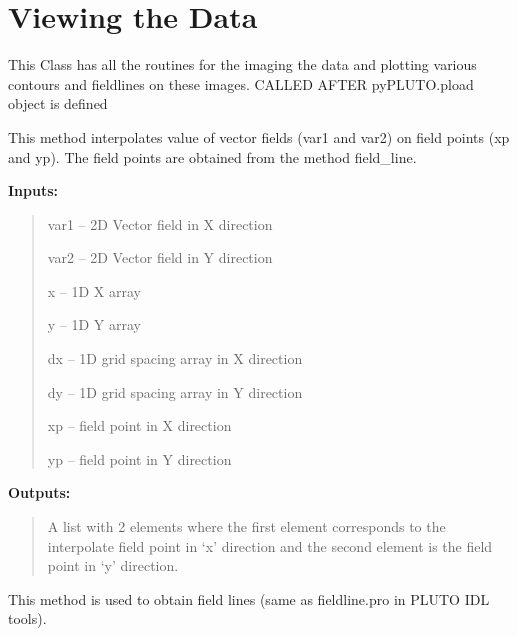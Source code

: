 \documentclass[letterpaper,10pt,english]{sphinxmanual}
\begin{document}
\section{Viewing the Data}
\label{image:viewing-the-data}\label{image::doc}

\begin{fulllineitems}
\label{image:pyPLUTO.Image}
This Class has all the routines for the imaging the data
and plotting various contours and fieldlines on these images.
CALLED AFTER pyPLUTO.pload object is defined

\begin{fulllineitems}
\label{image:pyPLUTO.Image.field_interp}
This method interpolates value of vector fields (var1 and var2) on field points (xp and yp).
The field points are obtained from the method field\_line.

\textbf{Inputs:}
\begin{quote}

var1 -- 2D Vector field in X direction

var2 -- 2D Vector field in Y direction

x -- 1D X array

y -- 1D Y array

dx -- 1D grid spacing array in X direction

dy -- 1D grid spacing array in Y direction

xp -- field point in X direction

yp -- field point in Y direction
\end{quote}

\textbf{Outputs:}
\begin{quote}

A list with 2 elements where the first element corresponds to the interpolate field point in `x' direction and the second element is the field point in `y' direction.
\end{quote}

\end{fulllineitems}


\begin{fulllineitems}
\label{image:pyPLUTO.Image.field_line}
This method is used to obtain field lines (same as fieldline.pro in PLUTO IDL tools).


\end{fulllineitems}
\end{fulllineitems}
\end{document}
